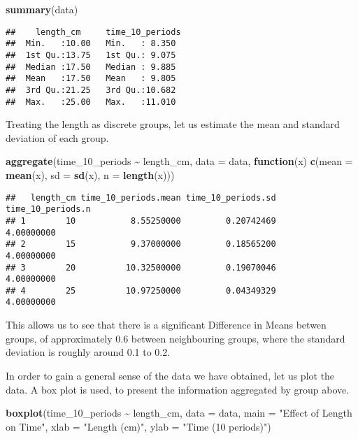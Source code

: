 \documentclass[
]{article}
\newenvironment{Shaded}{\begin{snugshade}}{\end{snugshade}}
\newcommand{\AttributeTok}[1]{\textcolor[rgb]{0.13,0.29,0.53}{#1}}
\newcommand{\ControlFlowTok}[1]{\textcolor[rgb]{0.13,0.29,0.53}{\textbf{#1}}}
\newcommand{\FunctionTok}[1]{\textcolor[rgb]{0.13,0.29,0.53}{\textbf{#1}}}
\newcommand{\NormalTok}[1]{#1}
\newcommand{\SpecialCharTok}[1]{\textcolor[rgb]{0.81,0.36,0.00}{\textbf{#1}}}
\newcommand{\StringTok}[1]{\textcolor[rgb]{0.31,0.60,0.02}{#1}}
\begin{document}
\begin{Shaded}
\begin{Highlighting}[]
\FunctionTok{summary}\NormalTok{(data)}
\end{Highlighting}
\end{Shaded}

\begin{verbatim}
##    length_cm     time_10_periods 
##  Min.   :10.00   Min.   : 8.350  
##  1st Qu.:13.75   1st Qu.: 9.075  
##  Median :17.50   Median : 9.885  
##  Mean   :17.50   Mean   : 9.805  
##  3rd Qu.:21.25   3rd Qu.:10.682  
##  Max.   :25.00   Max.   :11.010
\end{verbatim}

Treating the length as discrete groups, let us estimate the mean and
standard deviation of each group.

\begin{Shaded}
\begin{Highlighting}[]
\FunctionTok{aggregate}\NormalTok{(time\_10\_periods }\SpecialCharTok{\textasciitilde{}}\NormalTok{ length\_cm, }\AttributeTok{data =}\NormalTok{ data, }\ControlFlowTok{function}\NormalTok{(x) }\FunctionTok{c}\NormalTok{(}\AttributeTok{mean =} \FunctionTok{mean}\NormalTok{(x), }\AttributeTok{sd =} \FunctionTok{sd}\NormalTok{(x), }\AttributeTok{n =} \FunctionTok{length}\NormalTok{(x)))}
\end{Highlighting}
\end{Shaded}

\begin{verbatim}
##   length_cm time_10_periods.mean time_10_periods.sd time_10_periods.n
## 1        10           8.55250000         0.20742469        4.00000000
## 2        15           9.37000000         0.18565200        4.00000000
## 3        20          10.32500000         0.19070046        4.00000000
## 4        25          10.97250000         0.04349329        4.00000000
\end{verbatim}

This allows us to see that there is a significant Difference in Means
betwen groups, of approximately 0.6 between neighbouring groups, where
the standard deviation is roughly around 0.1 to 0.2.

In order to gain a general sense of the data we have obtained, let us
plot the data. A box plot is used, to present the information aggregated
by group above.

\begin{Shaded}
\begin{Highlighting}[]
\FunctionTok{boxplot}\NormalTok{(time\_10\_periods }\SpecialCharTok{\textasciitilde{}}\NormalTok{ length\_cm, }\AttributeTok{data =}\NormalTok{ data,}
    \AttributeTok{main =} \StringTok{"Effect of Length on Time"}\NormalTok{,}
    \AttributeTok{xlab =} \StringTok{"Length (cm)"}\NormalTok{,}
    \AttributeTok{ylab =} \StringTok{"Time (10 periods)"}\NormalTok{)}
\end{Highlighting}
\end{Shaded}
\end{document}
